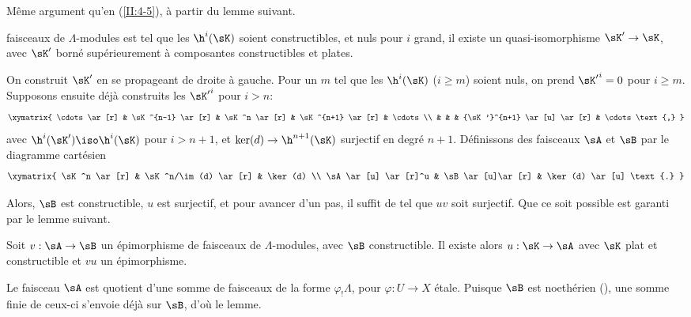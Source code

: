Même argument qu'en (\ref{II:4-5}), à partir du lemme suivant. 





\begin{lemma_}\label{II:4-7}
 faisceaux de $\Lambda$-modules est tel que les 
$\h^i(\sK)$ soient constructibles, et nuls pour $i$ grand, il existe un 
quasi-isomorphisme $\sK'\to \sK$, avec $\sK'$ borné supérieurement à 
composantes constructibles et plates.
\end{lemma_}

On construit $\sK'$ en se propageant de droite à gauche. Pour un $m$ tel que les 
$\h^i(\sK)$ ($i\geqslant m$) soient nuls, on prend ${\sK'}^i = 0$ pour 
$i\geqslant m$. Supposons ensuite déjà construits les ${\sK'}^i$ pour 
$i>n$:
\[\xymatrix{
  \cdots \ar[r] 
    & \sK^{n-1} \ar[r] 
    & \sK^n \ar[r] 
    & \sK^{n+1} \ar[r] 
    & \cdots \\
  & & & {\sK'}^{n+1} \ar[u] \ar[r] 
    & \cdots \text{,}
}\]
avec $\h^i(\sK')\iso \h^i(\sK)$ pour $i>n+1$, et $\ker(d)\to\h^{n+1}(\sK)$ surjectif 
en degré $n+1$. Définissons des faisceaux $\sA$ et $\sB$ par le diagramme 
cartésien 
\[\xymatrix{
  \sK^n \ar[r] 
    & \sK^n/\im(d) \ar[r] 
    & \ker(d) \\
  \sA \ar[u] \ar[r]^u 
    & \sB \ar[u]\ar[r] 
    & \ker(d) \ar[u] \text{.}
}\]

Alors, $\sB$ est constructible, $u$ est surjectif, et pour avancer d'un pas, il 
suffit de  tel que
$u v$ soit surjectif. Que ce soit possible est garanti par le lemme suivant. 





\begin{lemma_}\label{II:4-8}
Soit $v:\sA\to \sB$ un épimorphisme de faisceaux de $\Lambda$-modules, avec 
$\sB$ constructible. Il existe alors $u:\sK\to \sA$ avec $\sK$ plat et 
constructible et $v u$ un épimorphisme. 
\end{lemma_}

Le faisceau $\sA$ est quotient d'une somme de faisceaux de la forme 
$\varphi_! \Lambda$, pour $\varphi:U\to X$ étale. Puisque $\sB$ est noethérien 
(), une somme finie de ceux-ci s'envoie déjà sur $\sB$, 
d'où le lemme. 





